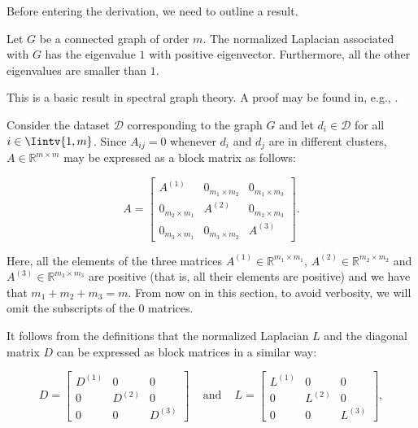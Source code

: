 Before entering the derivation, we need to outline a result.

\begin{proposition}
   \label{bigeigenvalue}
   Let $G$ be a connected graph of order $m$.
   The normalized Laplacian associated with $G$ has the eigenvalue $1$ with positive eigenvector.
   Furthermore, all the other eigenvalues are smaller than $1$.
\end{proposition}

This is a basic result in spectral graph theory.
A proof may be found in, e.g., \cite{mahoney}.

Consider the dataset $\mathcal D$ corresponding to the graph $G$ and let $d_i \in \mathcal D$ for all $i \in \Iintv{1,m}$. Since $A_{ij} = 0$ whenever $d_i$ and $d_j$ are in different clusters, $A \in \mathbb{R} ^{m \times m}$ may be expressed as a block matrix as follows:

\begin{equation}
   A = 
   \begin{bmatrix}
      A^{(1)} & 0_{m_1 \times m_2} & 0_{m_1 \times m_3} \\
      0_{m_2 \times m_1} & A^{(2)} & 0_{m_2 \times m_3} \\
      0_{m_3 \times m_1} & 0_{m_3 \times m_2} & A^{(3)}
   \end{bmatrix}.
\end{equation}

Here, all the elements of the three matrices $A^{(1)} \in \mathbb R^{m_1 \times m_1}$, $A^{(2)} \in \mathbb R^{m_2 \times m_2}$ and $A^{(3)} \in \mathbb R ^{m_3 \times m_3}$ are positive (that is, all their elements are positive) and we have that $m_1+m_2+m_3 = m$. 
From now on in this section, to avoid verbosity, we will omit the subscripts of the $0$ matrices.

It follows from the definitions that the normalized Laplacian $L$ and the diagonal matrix $D$ can be expressed as block matrices in a similar way:

\begin{equation}
 D =
   \begin{bmatrix}
      D^{(1)} & 0 & 0 \\
      0 & D^{(2)} & 0 \\
      0 & 0 & D^{(3)}
   \end{bmatrix}
   \,\,\,\,\,\text{ and }\,\,\,\,\,
   L = 
   \begin{bmatrix}
      L^{(1)} & 0 & 0 \\
      0 & L^{(2)} & 0 \\
      0 & 0 & L^{(3)}
   \end{bmatrix},
\end{equation}

